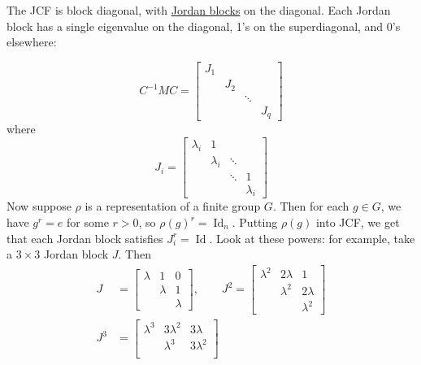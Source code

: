 \documentclass[12pt]{article}
\newcommand\inv[1]{#1^{-1}}
\theoremstyle{definition}
\DeclareMathOperator\Id{Id}
\begin{document}
\begin{enumerate}
\begin{itemize}
        The JCF is block diagonal, with \underline{Jordan blocks} on the diagonal. Each Jordan block has a single eigenvalue on the diagonal, 1's on the superdiagonal, and 0's elsewhere:
    \end{itemize}
    \begin{equation}
        \inv{C} M C = 
        \begin{bmatrix}
            J_1 & & \\
             & J_2 & \\
             & & \ddots & \\
             & & & J_q
        \end{bmatrix}
    \end{equation}
    where 
    \begin{equation}
        J_i = 
        \begin{bmatrix}
            \lambda_i & 1 & &  \\
             & \lambda_i & \ddots & \\
             & & \ddots & 1 \\
             & & & \lambda_i 
        \end{bmatrix}
    \end{equation}
    Now suppose $\rho$ is a representation of a finite group $G$. Then for each $g \in G$, we have $g^r = e$ for some $r > 0$, so $\rho(g)^r = \Id_n$. Putting $\rho(g)$ into JCF, we get that each Jordan block satisfies $J_i^r = \Id$. Look at these powers: for example, take a $3 \times 3$ Jordan block $J$. Then 
    \begin{equation}
        \begin{split}
            J & = 
        \begin{bmatrix}
            \lambda & 1 & 0 \\
             & \lambda & 1 \\
             & & \lambda
        \end{bmatrix}
        ,
        \qquad
        J^2 =
        \begin{bmatrix}
            \lambda^2 & 2\lambda & 1 \\
             & \lambda^2 & 2\lambda \\
             & & \lambda^2
        \end{bmatrix} \\
        J^3 & = 
        \begin{bmatrix}
            \lambda^3 & 3\lambda^2 & 3\lambda \\
             & \lambda^3 & 3\lambda^2 \\

\end{bmatrix}
\end{split}
\end{equation}
\end{enumerate}
\end{document}
